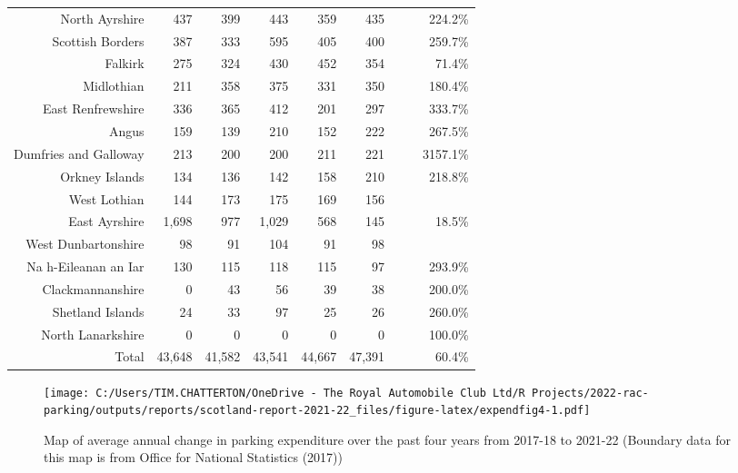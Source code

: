 \documentclass[
  12pt,
]{article}
\begin{document}
\begin{longtable}[t]{rrrrrrrrr}
North Ayrshire & 437 & 399 & 443 & 359 & 435 & \cellcolor{white}{ 21.2\%} & \cellcolor{white}{ -0.1\%} & 224.2\%\\
Scottish Borders & 387 & 333 & 595 & 405 & 400 & \cellcolor{white}{ -1.2\%} & \cellcolor{white}{  0.8\%} & 259.7\%\\
Falkirk & 275 & 324 & 430 & 452 & 354 & \cellcolor{white}{-21.7\%} & \cellcolor{white}{  6.5\%} & 71.4\%\\
Midlothian & 211 & 358 & 375 & 331 & 350 & \cellcolor{white}{  5.7\%} & \cellcolor{white}{ 13.5\%} & 180.4\%\\
East Renfrewshire & 336 & 365 & 412 & 201 & 297 & \cellcolor{white}{ 47.8\%} & \cellcolor{white}{ -3.0\%} & 333.7\%\\
Angus & 159 & 139 & 210 & 152 & 222 & \cellcolor{white}{ 46.1\%} & \cellcolor{white}{  8.7\%} & 267.5\%\\
Dumfries and Galloway & 213 & 200 & 200 & 211 & 221 & \cellcolor{white}{  4.7\%} & \cellcolor{white}{  0.9\%} & 3157.1\%\\
Orkney Islands & 134 & 136 & 142 & 158 & 210 & \cellcolor{white}{ 32.9\%} & \cellcolor{white}{ 11.9\%} & 218.8\%\\
West Lothian & 144 & 173 & 175 & 169 & 156 & \cellcolor{white}{ -7.7\%} & \cellcolor{white}{  2.0\%} & \\
East Ayrshire & 1,698 & 977 & 1,029 & 568 & 145 & \cellcolor{white}{-74.5\%} & \cellcolor{white}{-45.9\%} & 18.5\%\\
West Dunbartonshire & 98 & 91 & 104 & 91 & 98 & \cellcolor{white}{  7.7\%} & \cellcolor{white}{  0.0\%} & \\
Na h-Eileanan an Iar & 130 & 115 & 118 & 115 & 97 & \cellcolor{white}{-15.7\%} & \cellcolor{white}{ -7.1\%} & 293.9\%\\
Clackmannanshire & 0 & 43 & 56 & 39 & 38 & \cellcolor{white}{ -2.6\%} & \cellcolor{white}{} & 200.0\%\\
Shetland Islands & 24 & 33 & 97 & 25 & 26 & \cellcolor{white}{  4.0\%} & \cellcolor{white}{  2.0\%} & 260.0\%\\
North Lanarkshire & 0 & 0 & 0 & 0 & 0 & \cellcolor{white}{  0.0\%} & \cellcolor{white}{  0.0\%} & 100.0\%\\
\midrule
Total & 43,648 & 41,582 & 43,541 & 44,667 & 47,391 & \cellcolor{white}{  6.1\%} & \cellcolor{white}{  2.1\%} & 60.4\%\\*
\end{longtable}
\endgroup{}

\begin{figure}
\centering
\texttt{[image: C:/Users/TIM.CHATTERTON/OneDrive - The Royal Automobile Club Ltd/R Projects/2022-rac-parking/outputs/reports/scotland-report-2021-22\_files/figure-latex/expendfig4-1.pdf]}
\caption{\label{fig:expendfig4}Map of average annual change in parking expenditure over the past four years from 2017-18 to 2021-22 (Boundary data for this map is from Office for National Statistics (2017))}
\end{figure}
\end{document}
